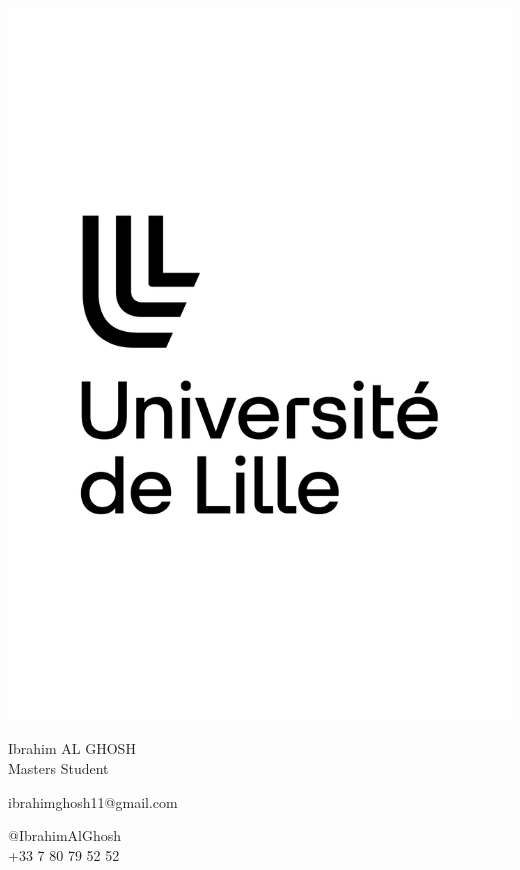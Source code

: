 \documentclass{article}
\begin{document}
\centering \includegraphics[width=.25\linewidth]{logo}\\[5pt]
\parbox{2in}{\Large \centering Ibrahim AL GHOSH\\[1pt]
\normalsize Masters Student}

\vfill
\raggedright
\begin{multicols}{2}
ibrahimghosh11@gmail.com

\columnbreak
\raggedleft
@IbrahimAlGhosh\\
+33 7 80 79 52 52
\end{multicols}%
\end{document}
